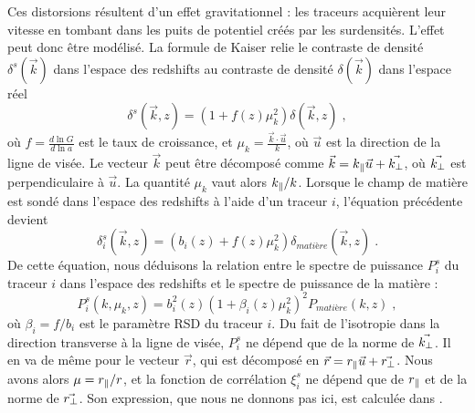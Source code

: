 \documentclass[11pt, twoside, a4paper, openright]{report}
\begin{document}
Ces distorsions résultent d'un effet gravitationnel : les traceurs acquièrent leur vitesse en tombant dans les puits de potentiel créés par les surdensités. L'effet peut donc être modélisé.
La formule de Kaiser \autocite{Kaiser1987} relie le contraste de densité $\delta^s(\vec k)$ dans l'espace des redshifts au contraste de densité $\delta(\vec k)$ dans l'espace réel
\begin{equation}
  \label{eq:kaiser}
  \delta^{s}(\vec k, z) = (1 + f(z) \mu_k^2) \delta(\vec k, z)  \; ,
\end{equation}
où $f = \displaystyle \frac{d \ln{G}}{d \ln{a}}$ est le taux de croissance, et $\mu_k = \displaystyle \frac{\vec k \cdot \vec u}{k}$, où $\vec u$ est la direction de la ligne de visée.
Le vecteur $\vec k$ peut être décomposé comme $\vec k = k_{\parallel}{} \vec u + \vec {k_{\perp}}{}$, où $\vec {k_{\perp}}{}$ est perpendiculaire à $\vec u$. La quantité $\mu_k$ vaut alors $k_{\parallel}{} / k$. 
Lorsque le champ de matière est sondé dans l'espace des redshifts à l'aide d'un traceur $i$, l'équation précédente devient
\begin{equation}
  \label{eq:kaiser2}
  \delta_i^{s}(\vec k, z) = (b_i(z) + f(z) \mu_k^2) \delta_{matière}(\vec k, z)  \; .
\end{equation}
De cette équation, nous déduisons la relation entre le spectre de puissance $P_{i}^{s}$ du traceur $i$ dans l'espace des redshifts et le spectre de puissance de la matière :
\begin{equation}
  \label{eq:kaiser3}
  P_{i}^s(k, \mu_k, z) = b_{i}^2(z)(1 + \beta_i(z) \mu_k^2)^2 P_{matière}(k, z)  \; ,
\end{equation}
où $\beta_i = f / b_i$ est le paramètre RSD du traceur $i$.
Du fait de l'isotropie dans la direction transverse à la ligne de visée, $P_i^s$ ne dépend que de la norme de $\vec {k_{\perp}}{}$. Il en va de même pour le vecteur $\vec r$, qui est décomposé en $\vec r =  r_{\parallel}{} \vec u + \vec {r_{\perp}}{}$. Nous avons alors $\mu = r_{\parallel}{} / r$, et la fonction de corrélation $\xi_i^s$ ne dépend que de $r_{\parallel}{}$ et de la norme de $\vec {r_{\perp}}{}$. Son expression, que nous ne donnons pas ici, est calculée dans \textcite{Hamilton1992}.
\end{document}

